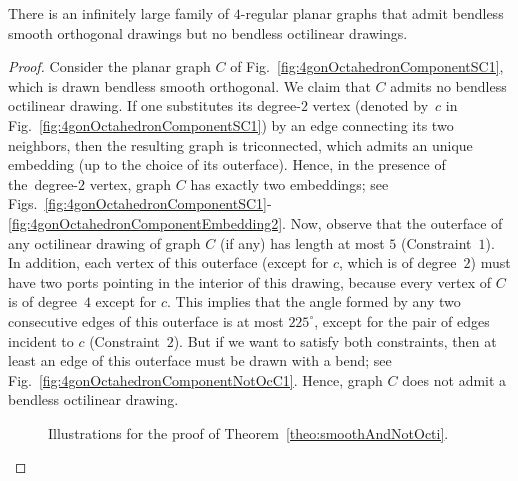 \begin{theorem}
There is an infinitely large family of $4$-regular planar graphs that admit bendless smooth orthogonal drawings but no bendless octilinear drawings.
\label{theo:smoothAndNotOcti}
\end{theorem}
\begin{proof}
Consider the planar graph $C$ of Fig.~\ref{fig:4gonOctahedronComponentSC1}, which is drawn bendless smooth orthogonal. We claim that $C$ admits no bendless octilinear drawing. If one substitutes its degree-$2$ vertex (denoted by~$c$ in Fig.~\ref{fig:4gonOctahedronComponentSC1}) by an edge connecting its two neighbors, then the resulting graph is triconnected, which admits an unique embedding (up to the choice of its outerface). Hence, in the presence of the~degree-$2$ vertex, graph $C$ has exactly two embeddings; see Figs.~\ref{fig:4gonOctahedronComponentSC1}-\ref{fig:4gonOctahedronComponentEmbedding2}. Now, observe that the outerface of any octilinear drawing of graph $C$ (if any) has length at most $5$ (Constraint~$1$). In addition, each vertex of this outerface (except for $c$, which is of degree~$2$) must have two ports pointing in the interior of this drawing, because every vertex of $C$ is of degree~$4$ except for $c$. This implies that the angle formed by any two consecutive edges of this outerface is at most $225^\circ$, except for the pair of edges incident to $c$ (Constraint~$2$). But if we want to satisfy both constraints, then at least an edge of this outerface must be drawn with a bend; see Fig.~\ref{fig:4gonOctahedronComponentNotOcC1}. Hence, graph $C$ does not admit a bendless octilinear drawing.

\begin{figure}[t!]
	\centering
	\begin{minipage}[b]{0.18\textwidth}
		\centering
	\end{minipage}
	\hfil
	\begin{minipage}[b]{0.18\textwidth}
		\centering
	\end{minipage}
	\hfil
	\begin{minipage}[b]{0.18\textwidth}
		\centering
	\end{minipage}
	\hfil
	\begin{minipage}[b]{0.36\textwidth}
		\centering
	\end{minipage}
	\caption{%
	Illustrations for the proof of Theorem~\ref{theo:smoothAndNotOcti}.}
\label{fig:4gonOctahedron}
\end{figure}


\end{proof}
